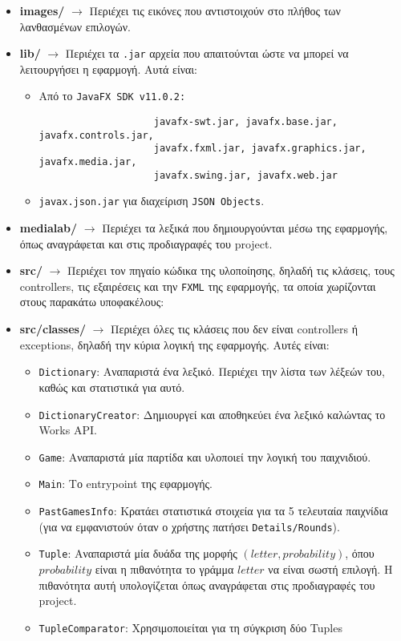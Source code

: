 \documentclass[a4paper, 12pt]{article}
\begin{document}
	\begin{itemize} 
		\item \textbf{images/} $\rightarrow$ Περιέχει τις εικόνες που αντιστοιχούν στο πλήθος των λανθασμένων επιλογών.
		\item \textbf{lib/} $\rightarrow$ Περιέχει τα \verb|.jar| αρχεία που απαιτούνται ώστε να μπορεί να λειτουργήσει η εφαρμογή. Αυτά είναι:
			\begin{itemize}
				\item Από το \verb|JavaFX SDK v11.0.2:|
				\begin{verbatim}
					javafx-swt.jar, javafx.base.jar, javafx.controls.jar, 
					javafx.fxml.jar, javafx.graphics.jar, javafx.media.jar, 
					javafx.swing.jar, javafx.web.jar
				\end{verbatim} 
				\item \verb|javax.json.jar| για διαχείριση \verb|JSON Objects|.
			\end{itemize} 
		
		\item \textbf{medialab/} $\rightarrow$ Περιέχει τα λεξικά που δημιουργούνται μέσω της εφαρμογής, όπως αναγράφεται και στις προδιαγραφές του project.
		
		\item \textbf{src/} $\rightarrow$ Περιέχει τον πηγαίο κώδικα της υλοποίησης, δηλαδή τις κλάσεις, τους controllers, τις εξαιρέσεις και την \verb|FXML| της εφαρμογής, τα οποία χωρίζονται στους παρακάτω υποφακέλους:
			
		\item \textbf{src/classes/} $\rightarrow$ Περιέχει όλες τις κλάσεις που δεν είναι controllers ή exceptions, δηλαδή την κύρια λογική της εφαρμογής. Αυτές είναι: 
				
			\begin{itemize}
				\item \verb|Dictionary|: Αναπαριστά ένα λεξικό. Περιέχει την λίστα των λέξεών του, καθώς και στατιστικά για αυτό.
				\item \verb|DictionaryCreator|: Δημιουργεί και αποθηκεύει ένα λεξικό καλώντας το Works API.
				\item \verb|Game|: Αναπαριστά μία παρτίδα και υλοποιεί την λογική του παιχνιδιού.
				\item \verb|Main|: Το entrypoint της εφαρμογής.
				\item \verb|PastGamesInfo|: Κρατάει στατιστικά στοιχεία για τα 5 τελευταία παιχνίδια (για να εμφανιστούν όταν ο χρήστης πατήσει \verb|Details/Rounds|).
				\item \verb|Tuple|: Αναπαριστά μία δυάδα της μορφής $(letter, probability)$, όπου $probability$ είναι η πιθανότητα το γράμμα $letter$ να είναι σωστή επιλογή. Η πιθανότητα αυτή υπολογίζεται όπως αναγράφεται στις προδιαγραφές του project. 
				\item \verb|TupleComparator|: Χρησιμοποιείται για τη σύγκριση δύο Tuples
			\end{itemize}
				

\end{itemize}
\end{document}

